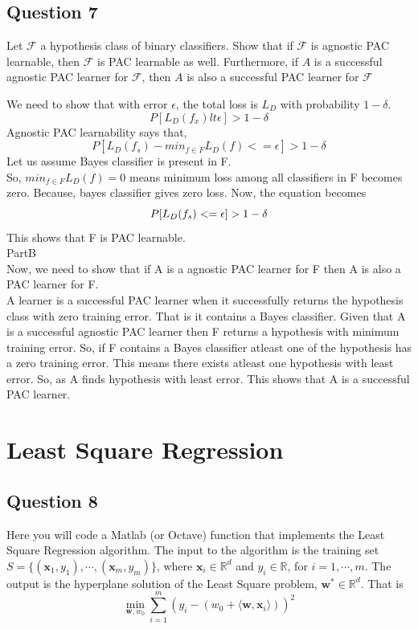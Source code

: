 \documentclass{article}
\newcommand{\field}[1]{\mathbb{#1}}
\newcommand{\set}[1]{\mathcal{#1}}
\newcommand{\fF}{\set{F}}
\newcommand{\R}{\field{R}}
\newcommand{\bx}{\boldsymbol{x}}
\newcommand{\bw}{\boldsymbol{w}}
\begin{document}
\subsection{Question 7}
Let $\fF$ a hypothesis class of binary classifiers. Show that if $\fF$ is agnostic PAC learnable, then $\fF$ is PAC learnable as well. Furthermore, if $A$ is a successful agnostic PAC learner for $\fF$, then $A$ is also a successful PAC learner for $\fF$
\begin{mdframed}[backgroundcolor=lightgray]
We need to show that with error $\epsilon$, the total loss is $L_D$ with probability $1-\delta$.
\[
P[L_D(f_x) lt \epsilon] > 1- \delta
\]
Agnostic PAC learnability says that, 
\[
P[L_D(f_s) - min_{f \in F} L_D(f) <= \epsilon] > 1-\delta
\]
Let us assume Bayes classifier is present in F.\\
So, $min_{f \in F} L_D(f) = 0$ means minimum loss among all classifiers in F becomes zero. Because, bayes classifier gives zero loss.
Now, the equation becomes 
\[
P[L_D(f_s) <= \epsilon]> 1 - \delta\\
\]
This shows that F is PAC learnable.\\

PartB\\
Now, we need to show that if A is a agnostic PAC learner for F then A is also a PAC learner for F.\\
A learner is a successful PAC learner when it successfully returns the hypothesis class with zero training error. That is it contains a Bayes classifier. Given that A is a successful agnostic PAC learner then  F returns a hypothesis with minimum training error. So, if F contains a Bayes classifier atleast one of the hypothesis has a zero training error. This means there exists atleast one hypothesis with least error. So, as A finds hypothesis with least error. This shows that A is a successful PAC learner.
\end{mdframed}

\section{Least Square Regression}

\subsection{Question 8}
Here you will code a Matlab (or Octave) function that implements the Least Square Regression algorithm. The input to the algorithm is the training set $S=\{(\bx_1,y_1), \cdots, (\bx_m,y_m)\}$, where $\bx_i \in \R^d$ and $y_i \in \R$, for $i=1, \cdots, m$. The output is the hyperplane solution of the Least Square problem, $\bw^*\in \R^d$. That is
\[
\min_{\bw,w_0} \sum_{i=1}^m (y_i -(w_0 + \langle \bw, \bx_i\rangle))^2
\]
\end{document}
